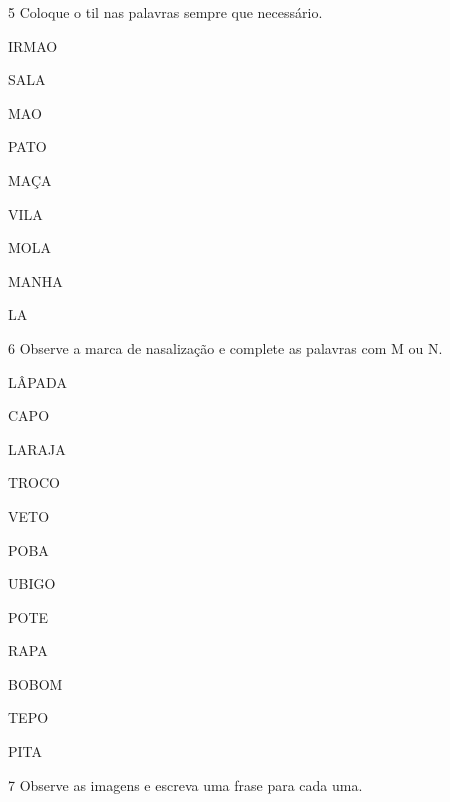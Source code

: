 
\num{5} Coloque o til nas palavras sempre que necessário.


\begin{multicols}{3}
IRMAO

SALA

MAO

PATO

MAÇA

VILA

MOLA

MANHA

LA
\end{multicols}

\num{6} Observe a marca de nasalização e complete as palavras com M ou N.


\begin{multicols}{3}
LÂPADA

CAPO

LARAJA

TROCO

VETO

POBA

UBIGO

POTE

RAPA

BOBOM

TEPO

PITA
\end{multicols}

\num{7} Observe as imagens e escreva uma frase para cada uma.


